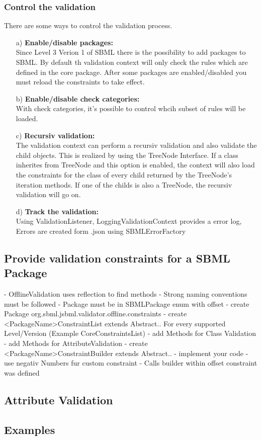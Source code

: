 \subsubsection{Control the validation}
There are some ways to control the validation process.
\begin{itemize}
\item[a)] \textbf{Enable/disable packages:}\\
Since Level 3 Verion 1 of SBML there is the possibility to add packages to SBML. By default th validation context will only check the rules which are defined in the core package. After some packages are enabled/disabled you must reload the constraints to take effect.
\item[b)] \textbf{Enable/disable check categories:}\\
With check categories, it's possible to control whcih subset of rules will be loaded.
\item[c)] \textbf{Recursiv validation:}\\
The validation context can perform a recursiv validation and also validate the child objects. This is realized by using the TreeNode Interface. If a class inherites from TreeNode and this option is enabled, the context will also load the constraints for the class of every child returned by the TreeNode's iteration methods. If one of the childs is also a TreeNode, the recursiv validation will go on.
\item[d)] \textbf{Track the validation:}\\
Using ValidationListener, LoggingValidationContext provides a error log, Errors are created form .json using SBMLErrorFactory
\end{itemize}


\subsection{Provide validation constraints for a SBML Package}
- OfflineValidation uses reflection to find methods
	- Strong naming conventions must be followed
- Package must be in SBMLPackage enum with offset
- create Package org.sbml.jsbml.validator.offline.constraints
- create <PackageName>ConstraintList extends Abstract.. For every supported Level/Version (Example CoreConstraintsList)
	- add Methods for Class Validation
	- add Methods for AttributeValidation
- create <PackageName>ConstraintBuilder extends Abstract..
- implement your code
- use negativ Numbers fur custom constraint
	- Calls builder within offset constraint was defined
	
\subsection{Attribute Validation}

\subsection{Examples}